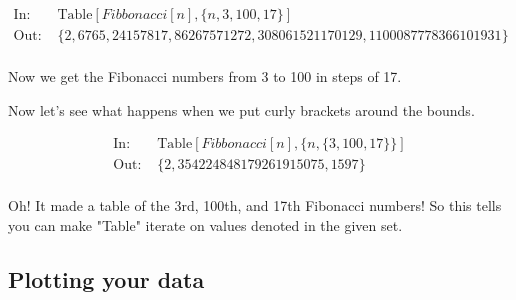 \documentclass[11pt,a4paper,twoside]{article}
\begin{document}
				\begin{align*}
					\text{In: }& \text{Table} [ Fibbonacci[n] , \{ n,3,100,17 \} ] \\
					\text{Out: }& \{2,6765,24157817,86267571272,308061521170129,1100087778366101931\} \\
				\end{align*}
				
				Now we get the Fibonacci numbers from 3 to 100 in steps of 17.
				
				Now let's see what happens when we put curly brackets around the bounds.
				
				\begin{align*}
					\text{In: }& \text{Table} [ Fibbonacci[n] , \{ n, \{ 3,100,17 \} \} ] \\
					\text{Out: }& \{2,354224848179261915075,1597\} \\
				\end{align*}
				
				Oh! It made a table of the 3rd, 100th, and 17th Fibonacci numbers!  So this tells you can make "Table" iterate on values denoted in the given set.
				
			\subsection{Plotting your data}
			
\end{document}
